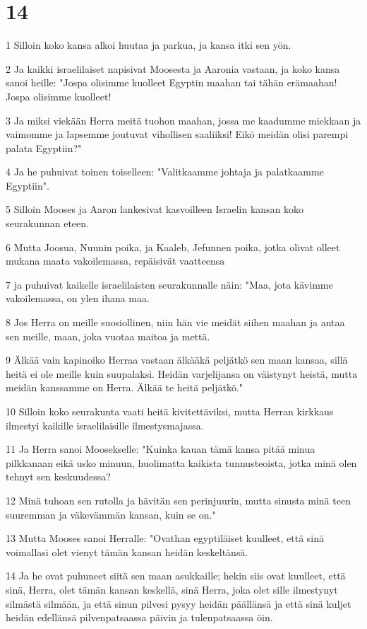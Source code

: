 \chapter{14}

\par 1 Silloin koko kansa alkoi huutaa ja parkua, ja kansa itki sen yön.
\par 2 Ja kaikki israelilaiset napisivat Moosesta ja Aaronia vastaan, ja koko kansa sanoi heille: "Jospa olisimme kuolleet Egyptin maahan tai tähän erämaahan! Jospa olisimme kuolleet!
\par 3 Ja miksi viekään Herra meitä tuohon maahan, jossa me kaadumme miekkaan ja vaimomme ja lapsemme joutuvat vihollisen saaliiksi! Eikö meidän olisi parempi palata Egyptiin?"
\par 4 Ja he puhuivat toinen toiselleen: "Valitkaamme johtaja ja palatkaamme Egyptiin".
\par 5 Silloin Mooses ja Aaron lankesivat kasvoilleen Israelin kansan koko seurakunnan eteen.
\par 6 Mutta Joosua, Nuunin poika, ja Kaaleb, Jefunnen poika, jotka olivat olleet mukana maata vakoilemassa, repäisivät vaatteensa
\par 7 ja puhuivat kaikelle israelilaisten seurakunnalle näin: "Maa, jota kävimme vakoilemassa, on ylen ihana maa.
\par 8 Jos Herra on meille suosiollinen, niin hän vie meidät siihen maahan ja antaa sen meille, maan, joka vuotaa maitoa ja mettä.
\par 9 Älkää vain kapinoiko Herraa vastaan älkääkä peljätkö sen maan kansaa, sillä heitä ei ole meille kuin suupalaksi. Heidän varjelijansa on väistynyt heistä, mutta meidän kanssamme on Herra. Älkää te heitä peljätkö."
\par 10 Silloin koko seurakunta vaati heitä kivitettäviksi, mutta Herran kirkkaus ilmestyi kaikille israelilaisille ilmestysmajassa.
\par 11 Ja Herra sanoi Moosekselle: "Kuinka kauan tämä kansa pitää minua pilkkanaan eikä usko minuun, huolimatta kaikista tunnusteoista, jotka minä olen tehnyt sen keskuudessa?
\par 12 Minä tuhoan sen rutolla ja hävitän sen perinjuurin, mutta sinusta minä teen suuremman ja väkevämmän kansan, kuin se on."
\par 13 Mutta Mooses sanoi Herralle: "Ovathan egyptiläiset kuulleet, että sinä voimallasi olet vienyt tämän kansan heidän keskeltänsä.
\par 14 Ja he ovat puhuneet siitä sen maan asukkaille; hekin siis ovat kuulleet, että sinä, Herra, olet tämän kansan keskellä, sinä Herra, joka olet sille ilmestynyt silmästä silmään, ja että sinun pilvesi pysyy heidän päällänsä ja että sinä kuljet heidän edellänsä pilvenpatsaassa päivin ja tulenpatsaassa öin.

